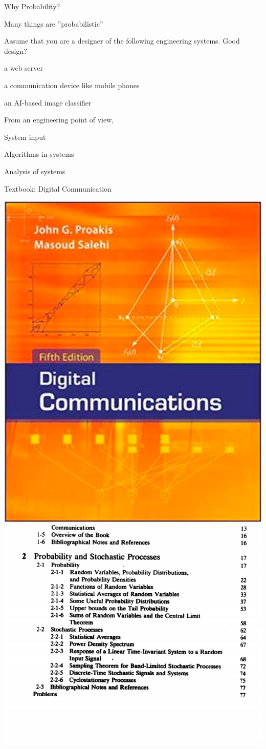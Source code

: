 \begin{frame}{Why Probability?}

\bci

\item<1-> Many things are ''probabilistic''

\item<2-> Assume that you are a designer of the following engineering systems. Good design?

\bci
\item a web server

\item  a communication device like mobile phones

\item an AI-based image classifier 
\eci

\item<3-> From an engineering point of view,

\bci
\item System input

\item Algorithms in systems

\item Analysis of systems
\eci

\eci

\end{frame}


\begin{frame}{Textbook: Digital Communication}

\centering
\includegraphics[height=6 cm]{L0_dctextbook.png}
\hspace{1cm}
\includegraphics[height=6 cm]{L0_dccontents.png}
\end{frame}

